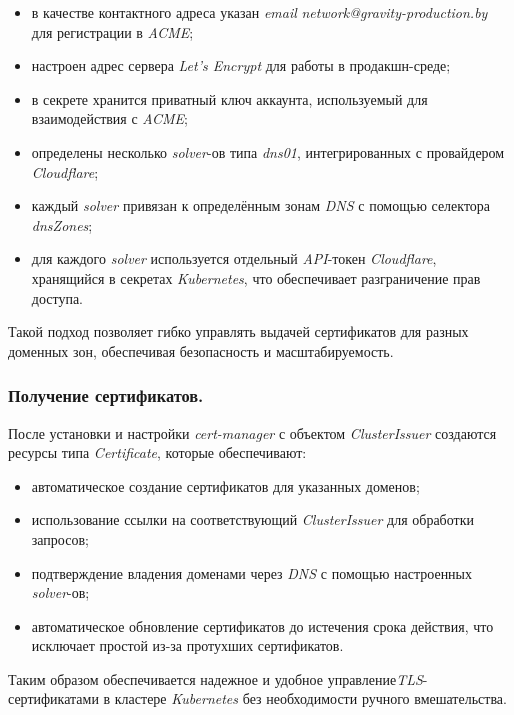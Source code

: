 \begin{itemize}
    \item в качестве контактного адреса указан \textit{email} \textit{network@gravity-production.by} для регистрации в \textit{ACME};
    \item настроен адрес сервера \textit{Let's Encrypt} для работы в продакшн-среде;
    \item в секрете хранится приватный ключ аккаунта, используемый для взаимодействия с \textit{ACME};
    \item определены несколько \textit{solver}-ов типа \textit{dns01}, интегрированных с провайдером \textit{Cloudflare};
    \item каждый \textit{solver} привязан к определённым зонам \textit{DNS} с помощью селектора \textit{dnsZones};
    \item для каждого \textit{solver} используется отдельный \textit{API}-токен \textit{Cloudflare}, хранящийся в секретах \textit{Kubernetes}, что обеспечивает разграничение прав доступа.
\end{itemize}

Такой подход позволяет гибко управлять выдачей сертификатов для разных доменных зон, обеспечивая безопасность и масштабируемость.

\subsubsection{Получение сертификатов.} После установки и настройки \textit{cert-manager} с объектом \textit{ClusterIssuer} создаются ресурсы типа \textit{Certificate}, которые обеспечивают:

\begin{itemize}
    \item автоматическое создание сертификатов для указанных доменов;
    \item использование ссылки на соответствующий \textit{ClusterIssuer} для обработки запросов;
    \item подтверждение владения доменами через \textit{DNS} с помощью настроенных \textit{solver}-ов;
    \item автоматическое обновление сертификатов до истечения срока действия, что исключает простой из-за протухших сертификатов.
\end{itemize}

Таким образом обеспечивается надежное и удобное управление\textit{TLS}-сертификатами в кластере \textit{Kubernetes} без необходимости ручного вмешательства.



